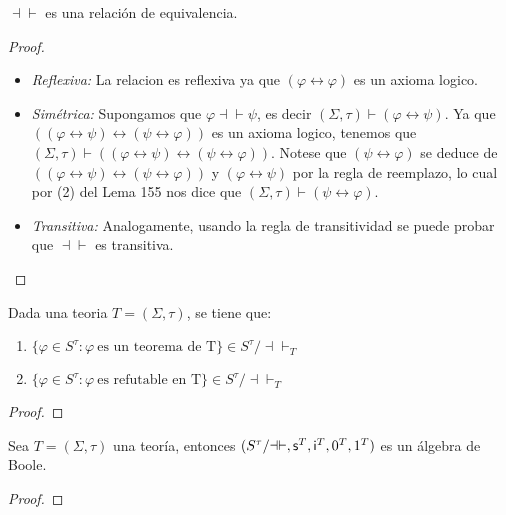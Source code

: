   \begin{lemma}
    \PN $\dashv \vdash$ es una relación de equivalencia.
  \end{lemma}
  \begin{proof}
    \PN \newline
    \begin{itemize}
      \item \textit{Reflexiva:} La relacion es reflexiva ya que $(\varphi \leftrightarrow \varphi )$ es un axioma logico.
      \item \textit{Simétrica:} Supongamos que $\varphi \dashv \vdash \psi $, es decir $(\Sigma, \tau)\vdash \left( \varphi \leftrightarrow \psi \right) $. Ya que $((\varphi \leftrightarrow \psi )\leftrightarrow (\psi \leftrightarrow \varphi ))$ es un axioma logico, tenemos que $(\Sigma, \tau)\vdash ((\varphi \leftrightarrow \psi )\leftrightarrow (\psi \leftrightarrow \varphi ))$. Notese que $\left( \psi \leftrightarrow \varphi \right) $ se deduce de $((\varphi \leftrightarrow \psi )\leftrightarrow (\psi \leftrightarrow \varphi ))$ y $(\varphi \leftrightarrow \psi )$ por la regla de reemplazo, lo cual por (2) del Lema 155 nos dice que $(\Sigma, \tau)\vdash \left( \psi \leftrightarrow \varphi \right) $.

      \item \textit{Transitiva:}   Analogamente, usando la regla de transitividad se puede probar que $\dashv \vdash $ es transitiva.
    \end{itemize}
  \end{proof}

  \begin{lemma}
    \PN Dada una teoria $T = (\Sigma, \tau)$, se tiene que:
    \begin{enumerate}[(1)]
      \item $\{\varphi \in S^{\tau}: \varphi \ \text{es un teorema de T}\} \in S^{\tau}/ \dashv \vdash_{T}$
      \item $\{\varphi \in S^{\tau}: \varphi \ \text{es refutable en T}\} \in S^{\tau}/ \dashv \vdash_{T}$
    \end{enumerate}
  \end{lemma}
  \begin{proof}
  \end{proof}

  \begin{lemma}
    \PN Sea $T = (\Sigma, \tau)$ una teoría, entonces $(S^{\tau}/\mathrm{\dashv \vdash}, \mathsf{s}^{T}, \mathsf{i}^{T}, 0^{T},
    1^{T})$ es un álgebra de Boole.
  \end{lemma}
  \begin{proof}
  \end{proof}

